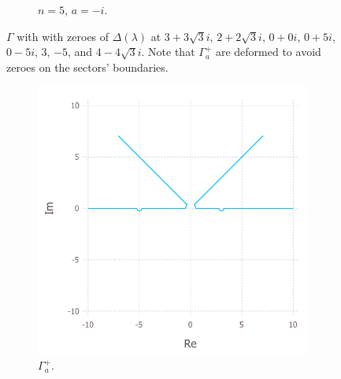 \documentclass[11pt, oneside, a4paper]{article}
\begin{document}
\begin{figure}
\begin{subfigure}{.5\textwidth}
        \caption{$n=5$, $a=-i$.}
    \end{subfigure}
    \caption{$\Gamma$ with with zeroes of $\Delta(\lambda)$ at $3+3\sqrt{3}i$, $2+2\sqrt{3}i$, $0+0i$, $0+5i$, $0-5i$, $3$, $-5$, and $4-4\sqrt{3}i$. Note that $\Gamma_a^+$ are deformed to avoid zeroes on the sectors' boundaries.}
    \label{fig:contourPlots}
\end{figure}

\begin{figure}
    \begin{subfigure}{.5\textwidth}
      \centering
      \includegraphics[width=1\linewidth]{contourPlot_n=2_a=1_gammaAPlus_cropped.pdf}
      \caption{$\Gamma_a^+$.}
    \end{subfigure}%
    \begin{subfigure}{.5\textwidth}
      \centering

\end{subfigure}
\end{figure}
\end{document}

